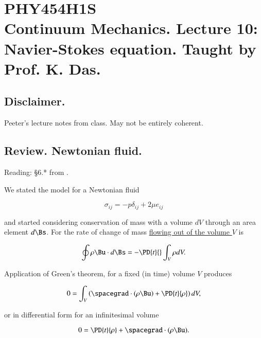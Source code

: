 %
%

\chapter{PHY454H1S\\Continuum Mechanics.  Lecture 10: Navier-Stokes equation.  Taught by Prof. K. Das.}
\label{chap:continuumL10}
{}
\date{Feb 10, 2012}

\beginArtWithToc

\section{Disclaimer.}

Peeter's lecture notes from class.  May not be entirely coherent.

\section{Review.  Newtonian fluid.}

Reading: \S 6.* from \cite{acheson1990elementary}.

We stated the model for a Newtonian fluid

\begin{equation}\label{eqn:continuumL10:10}
\sigma_{ij} = -p \delta_{ij} + 2 \mu e_{ij}
\end{equation}

and started considering conservation of mass with a volume $dV$ through an area element $d\Bs$.  For the rate of change of mass \underline{flowing out of the volume $V$} is 

\begin{equation}\label{eqn:continuumL10:30}
\oint \rho \Bu \cdot d\Bs = - \PD{t}{} \int_V \rho dV.
\end{equation}

Application of Green's theorem, for a fixed (in time) volume $V$ produces

\begin{equation}\label{eqn:continuumL10:50}
0 = \int_V \left( \spacegrad \cdot (\rho \Bu) + \PD{t}{\rho} \right) dV,
\end{equation}

or in differential form for an infinitesimal volume

\begin{equation}\label{eqn:continuumL10:70}
0 = \PD{t}{\rho} + \spacegrad \cdot (\rho \Bu).
\end{equation}

